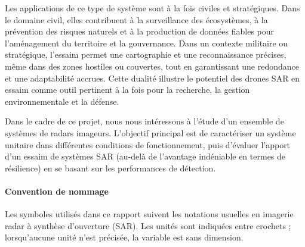 Les applications de ce type de système sont à la fois civiles et stratégiques. Dans le domaine civil, elles contribuent à la surveillance des écosystèmes, à la prévention des risques naturels et à la production de données fiables pour l’aménagement du territoire et la gouvernance. Dans un contexte militaire ou stratégique, l’essaim permet une cartographie et une reconnaissance précises, même dans des zones hostiles ou couvertes, tout en garantissant une redondance et une adaptabilité accrues. Cette dualité illustre le potentiel des drones SAR en essaim comme outil pertinent à la fois pour la recherche, la gestion environnementale et la défense.

Dans le cadre de ce projet, nous nous intéressons à l’étude d’un ensemble de systèmes de radars imageurs. L’objectif principal est de caractériser un système unitaire dans différentes conditions de fonctionnement, puis d’évaluer l’apport d’un essaim de systèmes SAR (au-delà de l’avantage indéniable en termes de résilience) en se basant sur les performances de détection. 

\paragraph{Convention de nommage}

Les symboles utilisés dans ce rapport suivent les notations usuelles en imagerie radar à synthèse d’ouverture (SAR).  
Les unités sont indiquées entre crochets ; lorsqu’aucune unité n’est précisée, la variable est sans dimension.

